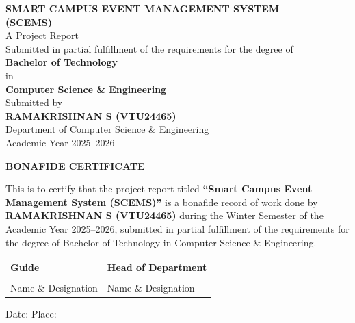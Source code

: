 \documentclass[12pt,a4paper]{report}
\begin{document}
\begin{titlepage}
\centering
\vspace*{1cm}
{\LARGE \textbf{SMART CAMPUS EVENT MANAGEMENT SYSTEM}}\\[0.5cm]
{\LARGE \textbf{(SCEMS)}}\\[2cm]
{\large A Project Report}\\[0.3cm]
{\large Submitted in partial fulfillment of the requirements for the degree of}\\[0.3cm]
{\large \textbf{Bachelor of Technology}}\\[0.3cm]
{\large in}\\[0.3cm]
{\large \textbf{Computer Science \& Engineering}}\\[2cm]
{\large Submitted by}\\[0.3cm]
{\large \textbf{RAMAKRISHNAN S (VTU24465)}}\\[2cm]
{\large Department of Computer Science \& Engineering}\\[0.3cm]
{\large Academic Year 2025--2026}\\
\vfill
\end{titlepage}

\newpage
\thispagestyle{empty}
\begin{center}
{\LARGE \textbf{BONAFIDE CERTIFICATE}}\\[1.5cm]
\end{center}

This is to certify that the project report titled \textbf{``Smart Campus Event Management System (SCEMS)''} is a bonafide record of work done by \textbf{RAMAKRISHNAN S (VTU24465)} during the Winter Semester of the Academic Year 2025--2026, submitted in partial fulfillment of the requirements for the degree of Bachelor of Technology in Computer Science \& Engineering.

\vspace{3cm}

\begin{tabular}{p{7cm}p{7cm}}
\textbf{Guide} & \textbf{Head of Department} \\[2cm]
\hrulefill & \hrulefill \\
Name \& Designation & Name \& Designation \\
\end{tabular}

\vspace{2cm}
\begin{center}
Date: \hrulefill \hspace{2cm} Place: \hrulefill
\end{center}
\end{document}
